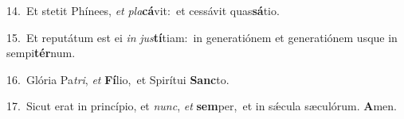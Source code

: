 {\numbfont\textcolor{\numbcolor}{14.}}~Et stetit Phínees, \textit{et} \textit{pla}\-\textbf{cá}vit:~\star et cessávit quas\-\textbf{sá}\-tio.\par
{\numbfont\textcolor{\numbcolor}{15.}}~Et reputátum est ei \textit{in} \textit{jus}\-\textbf{tí}tiam:~\star in generatiónem et generatiónem usque in sempi\-\textbf{tér}\-num.\par
{\numbfont\textcolor{\numbcolor}{16.}}~Glória Pa\-\textit{tri}\-, \textit{et} \textbf{Fí}\-lio,~\star et Spirítui \textbf{Sanc}\-to.\par
{\numbfont\textcolor{\numbcolor}{17.}}~Sicut erat in princípio, et \textit{nunc}\-, \textit{et} \textbf{sem}\-per,~\star et in sǽcula sæculórum. \textbf{A}\-men.\par
